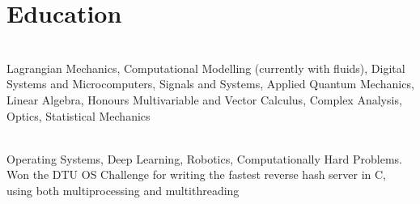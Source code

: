 \documentclass[]{deedy-resume-openfont}
\begin{document}
\section{Education}

\begin{adjustwidth}{0.55cm}{1.25cm}
	 \\
	 Lagrangian Mechanics, Computational Modelling (currently with fluids), Digital Systems and Microcomputers, Signals and Systems, Applied Quantum Mechanics, Linear Algebra, Honours Multivariable and Vector Calculus, Complex Analysis, Optics, Statistical Mechanics
\end{adjustwidth}

\vspace{8pt}

\begin{adjustwidth}{0.55cm}{1.25cm}
	 \\
	 Operating Systems, Deep Learning, Robotics, Computationally Hard Problems. \\
	Won the DTU OS Challenge for writing the fastest reverse hash server in C, using both multiprocessing and multithreading 
\end{adjustwidth}

\vspace{10pt}
\end{document}
